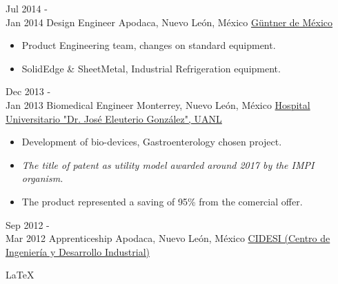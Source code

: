 \documentclass[a4paper]{twentysecondcv} %
\begin{document}
\begin{twenty}
    \twentyitem
   		{Jul 2014 - \\ Jan 2014}
        {Design Engineer}
        {Apodaca, Nuevo Le\'on,  M\'exico}
        {\href{http://www.guentner.com.mx/}{G\"{u}ntner de M\'exico}}
        {
        {
        \begin{itemize}
        \item Product Engineering team, changes on standard equipment.
        \item SolidEdge \& SheetMetal, Industrial Refrigeration equipment.
        \end{itemize}
        }
        }
        
     \twentyitem
        {Dec 2013 - \\ Jan 2013}
        {Biomedical Engineer }
        {Monterrey, Nuevo Le\'on, M\'exico}
        {\href{http://www.medicina.uanl.mx/servicios-y-departamentos/servicios-clinicos/gastroenterologia/}{Hospital Universitario "Dr. Jos\'e Eleuterio Gonz\'alez", UANL}}
        {
        \begin{itemize}
        \item Development of bio-devices, Gastroenterology chosen project.    
        \item
        \textit{The title of patent as utility model awarded around 2017 by the IMPI organism.}
        \item The product represented a saving of 95\% from the comercial offer.
        \end{itemize}
    	}
        
	\twentyitem
		{Sep 2012 - \\ Mar 2012}
		{Apprenticeship}
		{Apodaca, Nuevo Le\'on,  M\'exico}
		{\href{http://www.cidesi.com/}{CIDESI (Centro de Ingeniería y Desarrollo Industrial)}}
		
	
	
	
\end{twenty}
\begin{center}
\LaTeX
\end{center}
\end{document}
